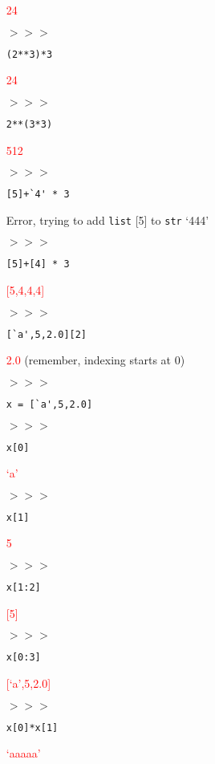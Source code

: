 \documentclass[11pt]{article}
\newcommand{\ans}[1]{\textcolor{red}{#1}}
\begin{document}
\begin{itemize}
\item[] \ans{24}
\item[$>>>$] \begin{verbatim}(2**3)*3\end{verbatim}
\item[] \ans{24}
\item[$>>>$] \begin{verbatim}2**(3*3)\end{verbatim}
\item[] \ans{512}
\item[$>>>$] \begin{verbatim}[5]+`4' * 3\end{verbatim}
\item[] Error, trying to add \texttt{list} [5] to \texttt{str} `444'
\item[$>>>$] \begin{verbatim}[5]+[4] * 3\end{verbatim}
\item[] \ans{[5,4,4,4]}
\item[$>>>$] \begin{verbatim}[`a',5,2.0][2]\end{verbatim}
\item[] \ans{2.0} (remember, indexing starts at $0$)
\item[$>>>$] \begin{verbatim}x = [`a',5,2.0]\end{verbatim}
\item[$>>>$] \begin{verbatim}x[0]\end{verbatim}
\item[] \ans{`a'}
\item[$>>>$] \begin{verbatim}x[1]\end{verbatim}
\item[] \ans{5}
\item[$>>>$] \begin{verbatim}x[1:2]\end{verbatim}
\item[] \ans{[5]}
\item[$>>>$] \begin{verbatim}x[0:3]\end{verbatim}
\item[] \ans{[`a',5,2.0]}
\item[$>>>$] \begin{verbatim}x[0]*x[1]\end{verbatim}
\item[] \ans{`aaaaa'}

\end{itemize}
\end{document}
